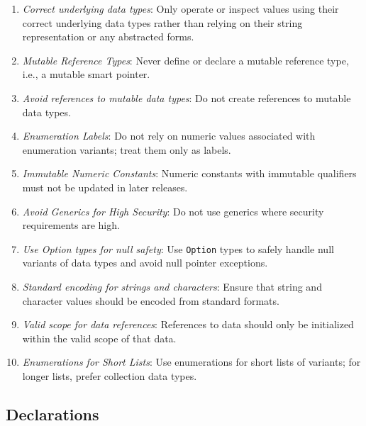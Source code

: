 \documentclass[9pt]{IEEEtran} %
\begin{document}
\begin{enumerate}
  \item \textit{Correct underlying data types}: Only operate or inspect values using their correct underlying data types rather than relying on their string representation or any abstracted forms.
  \item \textit{Mutable Reference Types}: Never define or declare a mutable reference type, i.e., a mutable smart pointer.
  \item \textit{Avoid references to mutable data types}: Do not create references to mutable data types.
  \item \textit{Enumeration Labels}: Do not rely on numeric values associated with enumeration variants; treat them only as labels.
  \item \textit{Immutable Numeric Constants}: Numeric constants with immutable qualifiers must not be updated in later releases.
  \item \textit{Avoid Generics for High Security}: Do not use generics where security requirements are high.
  \item \textit{Use Option types for null safety}: Use \texttt{Option} types to safely handle null variants of data types and avoid null pointer exceptions.
  \item \textit{Standard encoding for strings and characters}: Ensure that string and character values should be encoded from standard formats.
  \item \textit{Valid scope for data references}: References to data should only be initialized within the valid scope of that data.
  \item \textit{Enumerations for Short Lists}: Use enumerations for short lists of variants; for longer lists, prefer collection data types.
\end{enumerate}

\subsection{Declarations}
\label{ESSDeclarations}
\end{document}
